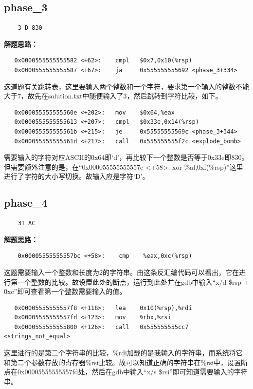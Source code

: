 \documentclass{article}
\begin{document}
\subsection{phase\_3}
\begin{verbatim}
    3 D 830
\end{verbatim}
\textbf{解题思路：}
\begin{verbatim}
   0x0000555555555582 <+62>:    cmpl   $0x7,0x10(%rsp)
   0x0000555555555587 <+67>:    ja     0x555555555692 <phase_3+334>
\end{verbatim}
这道题有关跳转表，这里要输入两个整数和一个字符，要求第一个输入的整数不能大于7，故先在solution.txt中随便输入了3，然后跳转到字符比较，如下。
\begin{verbatim}
   0x000055555555560e <+202>:   mov    $0x64,%eax
   0x0000555555555613 <+207>:   cmpl   $0x33e,0x14(%rsp)
   0x000055555555561b <+215>:   je     0x55555555569c <phase_3+344>
   0x000055555555561d <+217>:   call   0x555555555f2c <explode_bomb>
\end{verbatim}
需要输入的字符对应ASCII的0x64即‘d’，再比较下一个整数是否等于0x33e即830。但需要额外注意的是，在“0x000055555555557e <+58>:    xor    \%al,0xf(\%rsp)”这里进行了字符的大小写切换。故输入应是字符‘D’。

\subsection{phase\_4}
\begin{verbatim}
    31 AC
\end{verbatim}
\textbf{解题思路：}
\begin{verbatim}
    0x00005555555557bc <+58>:    cmp    %eax,0xc(%rsp)
\end{verbatim}
这题需要输入一个整数和长度为2的字符串。由这条反汇编代码可以看出，它在进行第一个整数的比较。故设置此处的断点，运行到此处并在gdb中输入“x/d \$rsp + 0xc”即可查看第一个整数需要输入的值。
\begin{verbatim}
   0x00005555555557f8 <+118>:   lea    0x10(%rsp),%rdi
   0x00005555555557fd <+123>:   mov    %rbx,%rsi
   0x0000555555555800 <+126>:   call   0x555555555cc7 <strings_not_equal>
\end{verbatim}
这里进行的是第二个字符串的比较，\%rdi加载的是我输入的字符串，而系统将它和第二个参数存放的寄存器\%rsi比较。故可以知道正确的字符串在\%rsi中，设置断点在0x00005555555557fd处，然后在gdb中输入“x/s \$rsi”即可知道需要输入的字符串。
\end{document}
